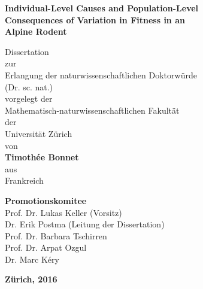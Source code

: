 \begin{titlepage}
	\thispagestyle{empty}
    \begin{center}
				 {\onehalfspacing \LARGE\selectfont\upshape\bfseries{Individual-Level Causes and Population-Level\\Consequences of Variation in Fitness in an\\ Alpine Rodent\\}}
				
				\vspace{1cm}
				
				\noindent\makebox[\linewidth]{\rule{0.8\paperwidth}{1pt}}
        
        \vspace{1cm}
				{\fontsize{22}{32pt}
				\doublespacing
        Dissertation
				\\
				zur
				\\
				Erlangung der naturwissenschaftlichen Doktorw\"urde
				\\
        (Dr. sc. nat.)
				\\
				vorgelegt der
				\\
				Mathematisch-naturwissenschaftlichen Fakult\"at
				\\
				der
				\\
				Universit\"at Z\"urich
				\\
				von
				\\
        \vspace{0.8cm}
        \textbf{Timoth\'ee Bonnet}
        \\
				aus
				\\
				Frankreich
				
				\vspace{0.8cm}
				\textbf{Promotionskomitee}
				\\
				Prof. Dr. Lukas Keller (Vorsitz)
				\\
				Dr. Erik Postma (Leitung der Dissertation)
				\\
				Prof. Dr. Barbara Tschirren
				\\
				Prof. Dr. Arpat Ozgul
				\\
				Dr. Marc K\'ery
				\\
				}
        \vfill
        
        \textbf{Z\"urich, 2016}
    \end{center}
	
\end{titlepage}
%
%

